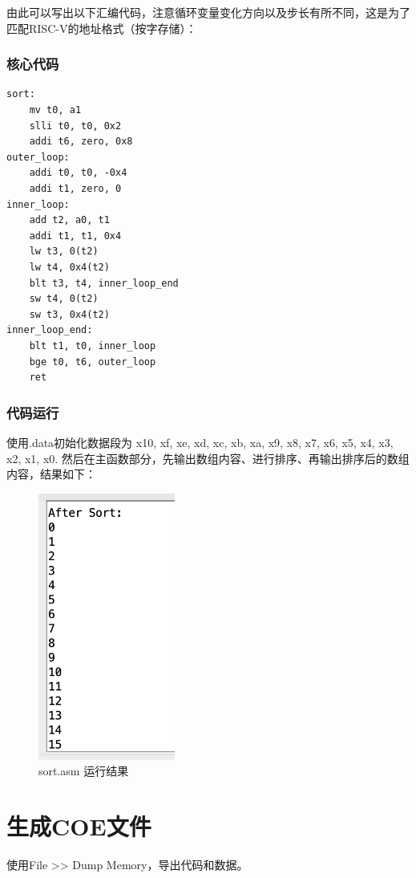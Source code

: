 \documentclass[a4paper]{article}
\begin{document}
由此可以写出以下汇编代码，注意循环变量变化方向以及步长有所不同，这是为了匹配RISC-V的地址格式（按字存储）：
\subsubsection{核心代码}

\begin{lstlisting}[language={[RISC-V]Assembler},title={srt.asm}]
sort:
    mv t0, a1
    slli t0, t0, 0x2
    addi t6, zero, 0x8
outer_loop:
    addi t0, t0, -0x4
    addi t1, zero, 0
inner_loop: 
    add t2, a0, t1
    addi t1, t1, 0x4
    lw t3, 0(t2)
    lw t4, 0x4(t2)
    blt t3, t4, inner_loop_end
    sw t4, 0(t2)
    sw t3, 0x4(t2)
inner_loop_end:
    blt t1, t0, inner_loop
    bge t0, t6, outer_loop
    ret
\end{lstlisting}
\subsubsection{代码运行} 
使用.data初始化数据段为 x10, xf, xe, xd, xc, xb, xa, x9, x8, x7, x6, x5, x4, x3, x2, x1, x0.
然后在主函数部分，先输出数组内容、进行排序、再输出排序后的数组内容，结果如下：

\begin{figure}[H]
    \centering
    \includegraphics[width=0.4\textwidth]{sort.png}
    \caption{sort.asm 运行结果}
    \label{fig:sort}
\end{figure}
\section{生成COE文件}
使用File >> Dump Memory，导出代码和数据。
\end{document}
